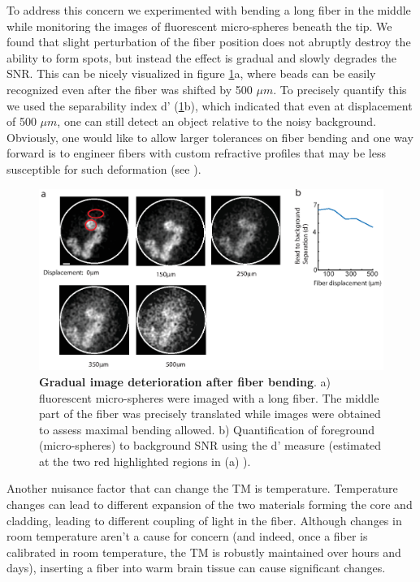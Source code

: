 \documentclass[10pt]{article}
\begin{document}
To address this concern we experimented with bending a long fiber in the middle while monitoring the images of fluorescent micro-spheres beneath the tip. We found that slight perturbation of the fiber position does not abruptly destroy the ability to form spots, but instead the effect is gradual and slowly degrades the SNR.  This can be nicely visualized in figure \ref{fig:figure9}a, where beads can be  easily recognized even after the fiber was shifted by 500 $\mu m$. To precisely quantify this we used the separability index  d' (\ref{fig:figure9}b), which indicated that even at displacement of 500 $\mu m$, one can still detect an object relative to the noisy background. Obviously, one would like to allow larger tolerances on fiber bending and one way forward is to engineer fibers with custom refractive profiles that may be less susceptible for such deformation (see \cite{Caravaca-Aguirre2017-wq}).

\begin{figure}
\centering\includegraphics[width=12cm]{figure9}
\caption{\textbf{Gradual image deterioration after fiber bending}.
a) fluorescent micro-spheres were imaged with a long fiber. The middle part of the fiber was precisely translated while images were obtained to assess maximal bending allowed. b) Quantification of foreground (micro-spheres) to background SNR using the d' measure (estimated at the two red highlighted regions in (a) ).
}
\label{fig:figure9}
\end{figure}


Another nuisance factor that can change the TM is temperature. Temperature changes can lead to different expansion of the two materials forming the core and cladding, leading to different coupling of light in the fiber. Although changes in room temperature aren't a cause for concern (and indeed, once a fiber is calibrated in room temperature, the TM is robustly maintained over hours and days), inserting a fiber into warm brain tissue can cause significant changes.
\end{document}
